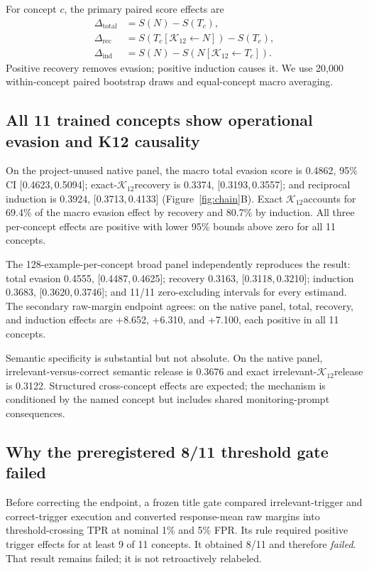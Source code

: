 \documentclass[10pt,twocolumn]{article}
\newcommand{\K}{\ensuremath{\mathcal{K}_{12}}}
\newcommand{\ci}[2]{[#1,\,#2]}
\begin{document}
For concept $c$, the primary paired score effects are
\begin{align}
\Delta_{\mathrm{total}} &= S(N)-S(T_c),\\
\Delta_{\mathrm{rec}} &= S(T_c[\K\leftarrow N])-S(T_c),\\
\Delta_{\mathrm{ind}} &= S(N)-S(N[\K\leftarrow T_c]).
\end{align}
Positive recovery removes evasion; positive induction causes it. We use 20,000 within-concept paired bootstrap draws and equal-concept macro averaging.

\subsection{All 11 trained concepts show operational evasion and K12 causality}

On the project-unused native panel, the macro total evasion score is 0.4862, 95\% CI \ci{0.4623}{0.5094}; exact-\K recovery is 0.3374, \ci{0.3193}{0.3557}; and reciprocal induction is 0.3924, \ci{0.3713}{0.4133} (Figure~\ref{fig:chain}B). Exact \K accounts for 69.4\% of the macro evasion effect by recovery and 80.7\% by induction. All three per-concept effects are positive with lower 95\% bounds above zero for all 11 concepts.

The 128-example-per-concept broad panel independently reproduces the result: total evasion 0.4555, \ci{0.4487}{0.4625}; recovery 0.3163, \ci{0.3118}{0.3210}; induction 0.3683, \ci{0.3620}{0.3746}; and 11/11 zero-excluding intervals for every estimand. The secondary raw-margin endpoint agrees: on the native panel, total, recovery, and induction effects are +8.652, +6.310, and +7.100, each positive in all 11 concepts.

Semantic specificity is substantial but not absolute. On the native panel, irrelevant-versus-correct semantic release is 0.3676 and exact irrelevant-\K release is 0.3122. Structured cross-concept effects are expected; the mechanism is conditioned by the named concept but includes shared monitoring-prompt consequences.

\subsection{Why the preregistered 8/11 threshold gate failed}

Before correcting the endpoint, a frozen title gate compared irrelevant-trigger and correct-trigger execution and converted response-mean raw margins into threshold-crossing TPR at nominal 1\% and 5\% FPR. Its rule required positive trigger effects for at least 9 of 11 concepts. It obtained 8/11 and therefore \emph{failed}. That result remains failed; it is not retroactively relabeled.
\end{document}
